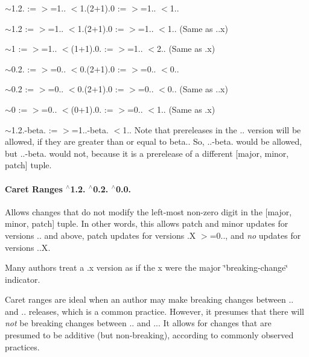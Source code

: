\begin{DoxyItemize}
\item {\ttfamily $\sim$1.2.} \+:= {\ttfamily $>$=1.. $<$1.(2+1).0} \+:= {\ttfamily $>$=1.. $<$1..}
\item {\ttfamily $\sim$1.2} \+:= {\ttfamily $>$=1.. $<$1.(2+1).0} \+:= {\ttfamily $>$=1.. $<$1..} (Same as {..\+x})
\item {\ttfamily $\sim$1} \+:= {\ttfamily $>$=1.. $<$(1+1).0.} \+:= {\ttfamily $>$=1.. $<$2..} (Same as {.\+x})
\item {\ttfamily $\sim$0.2.} \+:= {\ttfamily $>$=0.. $<$0.(2+1).0} \+:= {\ttfamily $>$=0.. $<$0..}
\item {\ttfamily $\sim$0.2} \+:= {\ttfamily $>$=0.. $<$0.(2+1).0} \+:= {\ttfamily $>$=0.. $<$0..} (Same as {..\+x})
\item {\ttfamily $\sim$0} \+:= {\ttfamily $>$=0.. $<$(0+1).0.} \+:= {\ttfamily $>$=0.. $<$1..} (Same as {.\+x})
\item {\ttfamily $\sim$1.2.-\/beta.} \+:= {\ttfamily $>$=1..-\/beta. $<$1..} Note that prereleases in the {..} version will be allowed, if they are greater than or equal to {\ttfamily beta.}. So, {..-\/beta.} would be allowed, but {..-\/beta.} would not, because it is a prerelease of a different {\ttfamily \mbox{[}major, minor, patch\mbox{]}} tuple.
\end{DoxyItemize}

\paragraph*{Caret Ranges {\ttfamily $^\wedge$1.2.} {\ttfamily $^\wedge$0.2.} {\ttfamily $^\wedge$0.0.}}

Allows changes that do not modify the left-\/most non-\/zero digit in the {\ttfamily \mbox{[}major, minor, patch\mbox{]}} tuple. In other words, this allows patch and minor updates for versions {..} and above, patch updates for versions {.\+X $>$=0..}, and {\itshape no} updates for versions {..\+X}.

Many authors treat a {.\+x} version as if the {\ttfamily x} were the major \char`\"{}breaking-\/change\char`\"{} indicator.

Caret ranges are ideal when an author may make breaking changes between {..} and {..} releases, which is a common practice. However, it presumes that there will {\itshape not} be breaking changes between {..} and {..}. It allows for changes that are presumed to be additive (but non-\/breaking), according to commonly observed practices.


